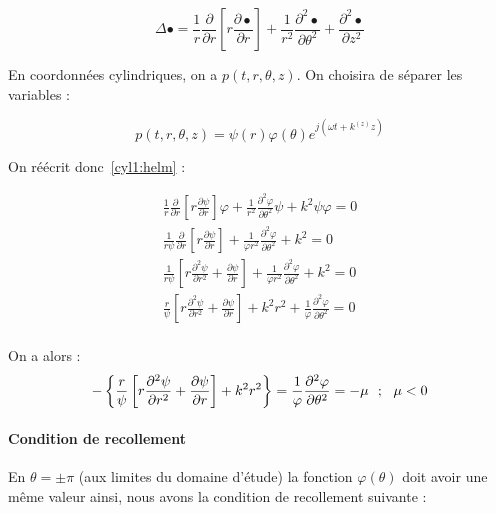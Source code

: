 \documentclass[11pt]{article}
\renewcommand{\phi}\varphi
\begin{document}
$$\Delta \bullet = \frac{1}{r}\frac{\partial}{\partial r}\left[r\frac{\partial\bullet}{\partial r}\right] +
\frac{1}{r^2}\frac{\partial^2\bullet}{\partial\theta^2}+\frac{\partial^2\bullet}{\partial z^2}$$

En coordonnées cylindriques, on a $p(t,r,\theta,z)$. On choisira de séparer les variables :

\begin{equation}
    p(t,r,\theta,z) = \psi(r)\phi(\theta)e^{j(\omega t+k^{(z)}z)} \label{cyl1:eq_p}
\end{equation}

On réécrit donc~\eqref{cyl1:helm} :

\begin{equation*}
\begin{array}{c}
\frac{1}{r}\frac{\partial}{\partial r}\left[r\frac{\partial\psi}{\partial r}\right]\phi +
\frac{1}{r^2}\frac{\partial^2\phi}{\partial\theta^2}\psi+k^2\psi\phi = 0\\
%
\frac{1}{r\psi}\frac{\partial}{\partial r}\left[r\frac{\partial\psi}{\partial r}\right] +
\frac{1}{\phi r^2}\frac{\partial^2\phi}{\partial\theta^2}+k^2 = 0\\
%
\frac{1}{r\psi}\left[r\frac{\partial^2\psi}{\partial r^2}+\frac{\partial\psi}{\partial r}\right] +
\frac{1}{\phi r^2}\frac{\partial^2\phi}{\partial\theta^2}+k^2 = 0\\
%
\frac{r}{\psi}\left[r\frac{\partial^2\psi}{\partial r^2}+\frac{\partial\psi}{\partial r}\right] + k^2r^2 +
\frac{1}{\phi}\frac{\partial^2\phi}{\partial\theta^2} = 0\\
\end{array}
\end{equation*}

On a alors :
\begin{equation}
-\left\{\frac{r}{\psi}\left[r\frac{\partial^2\psi}{\partial r^2}+\frac{\partial\psi}{\partial r}\right] + k^2r^2\right\} =
\frac{1}{\phi}\frac{\partial^2\phi}{\partial\theta^2} = -\mu ~~;~~ \mu < 0\label{cyl1:sepvar}\\
\end{equation}

\paragraph{Condition de recollement} En $\theta=\pm\pi$ (aux limites du domaine d'étude) la fonction $\phi(\theta)$ doit
avoir une même valeur ainsi, nous avons la condition de recollement suivante :
\end{document}
